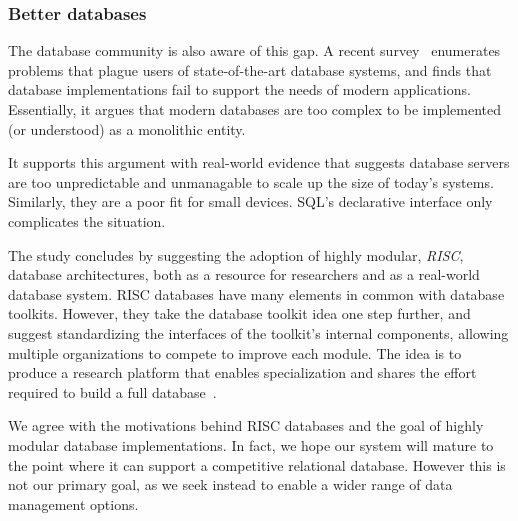\documentclass[letterpaper,twocolumn,10pt]{article}
\begin{document}

\subsubsection{Better databases}

The database community is also aware of this gap. 
A recent survey~\cite{riscDB} enumerates problems that plague users of
state-of-the-art database systems, and finds that database implementations fail to support the
needs of modern applications.  Essentially, it argues that modern 
databases are too complex to be implemented (or understood) 
as a monolithic entity.

It supports this argument with real-world evidence that suggests
database servers are too unpredictable and unmanagable to
scale up the size of today's systems.  Similarly, they are a poor fit
for small devices.  SQL's declarative interface only complicates the
situation.


The study concludes 
by suggesting the adoption of highly modular, {\em RISC}, database architectures, both as a resource for researchers and as a 
real-world database system.  
RISC databases have many elements in common with
database toolkits.  However, they take the database toolkit idea one
step further, and suggest standardizing the interfaces of the
toolkit's internal components, allowing multiple organizations to
compete to improve each module.  The idea is to produce a research
platform that enables specialization and shares the effort required to build a full database~\cite{riscDB}.

We agree with the motivations behind RISC databases and the goal
of highly modular database implementations.  In fact, we  hope
 our system will mature to the point where it can support 
a competitive relational database.  However this is
not our primary goal, as we seek instead to enable a wider range of data management options.
\end{document}
